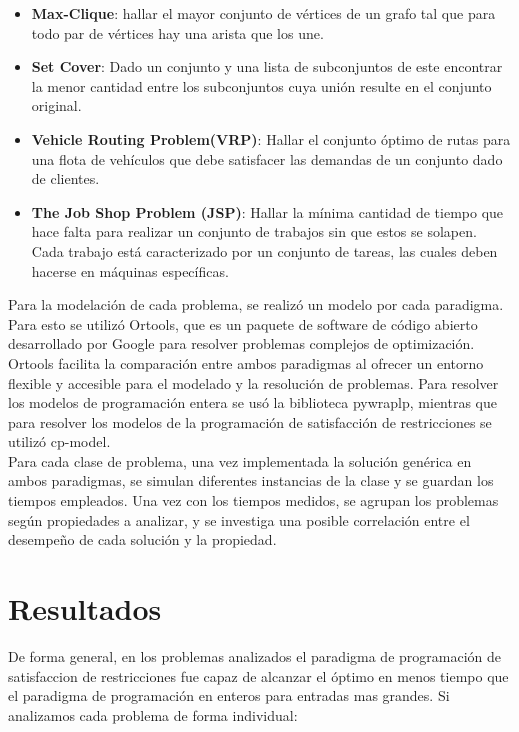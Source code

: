 \documentclass[12pt]{report}
\begin{document}
\begin{itemize}
\item \textbf{Max-Clique}: hallar el mayor conjunto de vértices de un grafo tal que para todo par de vértices hay una arista que los une.
\item \textbf{Set Cover}: Dado un conjunto y una lista de subconjuntos de este encontrar la menor cantidad entre los subconjuntos cuya unión resulte en el conjunto original.
\item \textbf{Vehicle Routing Problem(VRP)}:  Hallar el conjunto óptimo de rutas para una flota de vehículos que debe satisfacer las demandas de un conjunto dado de clientes.
\item \textbf{The Job Shop Problem (JSP)}: Hallar la mínima cantidad de tiempo que hace falta para realizar un conjunto de trabajos sin que estos se solapen. Cada trabajo está caracterizado por un conjunto de tareas, las cuales deben hacerse en máquinas específicas.\\

\end{itemize}

Para la modelación de cada problema, se realizó un modelo por cada paradigma. Para esto se utilizó Ortools, que es un paquete de software de código abierto desarrollado por Google para resolver problemas complejos de optimización. Ortools facilita la comparación entre ambos paradigmas al ofrecer un entorno flexible y accesible para el modelado y la resolución de problemas. Para resolver los modelos de programación entera se usó la biblioteca pywraplp, mientras que para resolver los modelos de la programación de satisfacción de  restricciones se utilizó cp-model.\\

Para cada clase de problema, una vez implementada la solución genérica en ambos paradigmas, se simulan diferentes instancias de la clase y se guardan los tiempos empleados. Una vez con los tiempos medidos, se agrupan los problemas según propiedades a analizar, y se investiga una posible correlación entre el desempeño de cada solución y la propiedad.

\chapter{Resultados}

De forma general, en los problemas analizados el paradigma de programación de satisfaccion de restricciones fue capaz de alcanzar el óptimo en menos tiempo que el paradigma de programación en enteros para entradas mas grandes. Si analizamos cada problema de forma individual:
\end{document}
